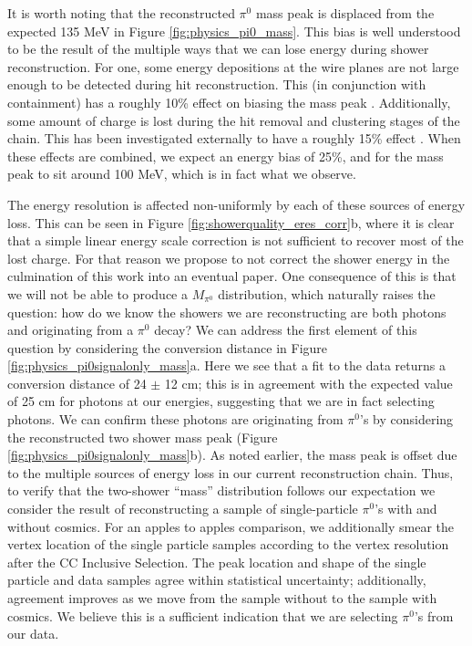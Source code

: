 \par It is worth noting that the reconstructed $\pi^0$ mass peak is displaced from the expected 135 MeV in Figure \ref{fig:physics_pi0_mass}. This bias is well understood to be the result of the multiple ways that we can lose energy during shower reconstruction. For one, some energy depositions at the wire planes are not large enough to be detected during hit reconstruction. This (in conjunction with containment) has a roughly 10\% effect on biasing the mass peak \cite{bib:davidc_hitthresholding}. Additionally, some amount of charge is lost during the hit removal and clustering stages of the chain.  This has been investigated externally to have a roughly 15\% effect \cite{bib:davidc_missingE}. When these effects are combined, we expect an energy bias of 25\%, and for the mass peak to sit around 100 MeV, which is in fact what we observe. 
\par The energy resolution is affected non-uniformly by each of these sources of energy loss. This can be seen in Figure \ref{fig:showerquality_eres_corr}b, where it is clear that a simple linear energy scale correction is not sufficient to recover most of the lost charge. For that reason we propose to not correct the shower energy in the culmination of this work into an eventual paper. One consequence of this is that we will not be able to produce a $M_{\pi^0}$ distribution, which naturally raises the question: how do we know the showers we are reconstructing are both photons and originating from a $\pi^0$ decay? We can address the first element of this question by considering the conversion distance in Figure \ref{fig:physics_pi0signalonly_mass}a.  Here we see that a fit to the data returns a conversion distance of 24 $\pm$ 12 cm; this is in agreement with the expected value of 25 cm for photons at our energies, suggesting that we are in fact selecting photons. We can confirm these photons are originating from $\pi^0$'s by considering the reconstructed two shower mass peak (Figure \ref{fig:physics_pi0signalonly_mass}b).  As noted earlier, the mass peak is offset due to the multiple sources of energy loss in our current reconstruction chain. Thus, to verify that the two-shower “mass” distribution follows our expectation we consider the result of reconstructing a sample of single-particle $\pi^0$’s with and without cosmics. For an apples to apples comparison, we additionally smear the vertex location of the single particle samples according to the vertex resolution after the CC Inclusive Selection.  The peak location and shape of the single particle and data samples agree within statistical uncertainty; additionally, agreement improves as we move from the sample without to the sample with cosmics. We believe this is a sufficient indication that we are selecting $\pi^0$'s from our data. 


